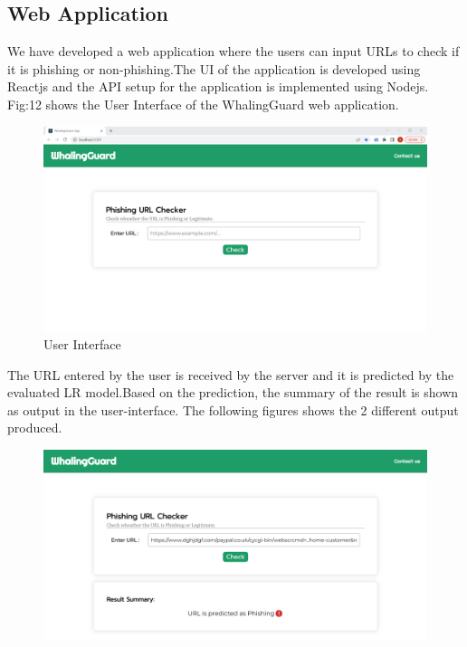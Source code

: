 \documentclass[conference]{IEEEtran}
\begin{document}
\subsection{Web Application}
\par We have developed a web application where the users can input URLs to check if it is phishing or non-phishing.The UI of the application is developed using Reactjs and the API setup for the application is implemented using Nodejs. Fig:12 shows the User Interface of the WhalingGuard web application.
\begin{figure}[H]
\centerline{\includegraphics[scale=0.2]{ui.png}}
\caption{User Interface}
\label{fig}
\end{figure}
\par The URL entered by the user is received by the server and it is predicted by the evaluated LR model.Based on the prediction, the summary of the result is shown as output in the user-interface. The following figures shows the 2 different output produced.
\begin{figure}[H]
\centerline{\includegraphics[scale=0.2]{uiP.png}}
\end{figure}
\end{document}
